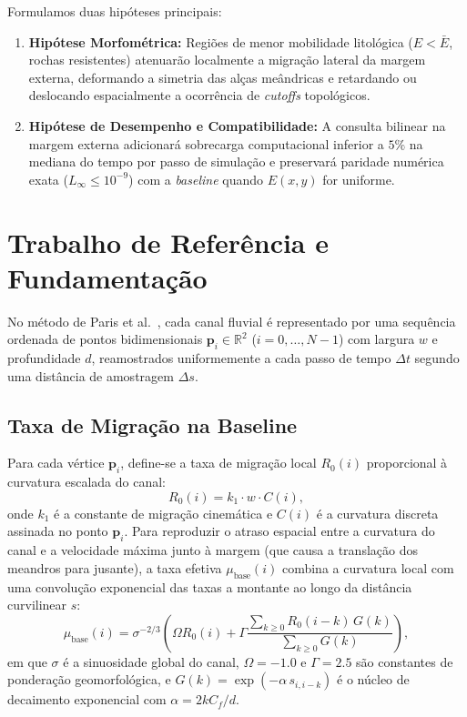 \documentclass[10pt,twocolumn,a4paper]{article}
\begin{document}
Formulamos duas hipóteses principais:
\begin{enumerate}
    \item \textbf{Hipótese Morfométrica:} Regiões de menor mobilidade litológica ($E < \bar{E}$, rochas resistentes) atenuarão localmente a migração lateral da margem externa, deformando a simetria das alças meândricas e retardando ou deslocando espacialmente a ocorrência de \textit{cutoffs} topológicos.
    \item \textbf{Hipótese de Desempenho e Compatibilidade:} A consulta bilinear na margem externa adicionará sobrecarga computacional inferior a $5\%$ na mediana do tempo por passo de simulação e preservará paridade numérica exata ($L_\infty \le 10^{-9}$) com a \textit{baseline} quando $E(x,y)$ for uniforme.
\end{enumerate}

\section{Trabalho de Referência e Fundamentação}
\label{sec:fundamentacao}

No método de Paris et al.~\cite{paris2023meandering}, cada canal fluvial é representado por uma sequência ordenada de pontos bidimensionais $\mathbf{p}_i \in \mathbb{R}^2$ ($i = 0, \dots, N-1$) com largura $w$ e profundidade $d$, reamostrados uniformemente a cada passo de tempo $\Delta t$ segundo uma distância de amostragem $\Delta s$.

\subsection{Taxa de Migração na Baseline}
Para cada vértice $\mathbf{p}_i$, define-se a taxa de migração local $R_0(i)$ proporcional à curvatura escalada do canal:
\begin{equation}
    R_0(i) = k_1 \cdot w \cdot C(i),
    \label{eq:local_migration}
\end{equation}
onde $k_1$ é a constante de migração cinemática e $C(i)$ é a curvatura discreta assinada no ponto $\mathbf{p}_i$. Para reproduzir o atraso espacial entre a curvatura do canal e a velocidade máxima junto à margem (que causa a translação dos meandros para jusante), a taxa efetiva $\mu_{\text{base}}(i)$ combina a curvatura local com uma convolução exponencial das taxas a montante ao longo da distância curvilinear $s$:
\begin{equation}
    \mu_{\text{base}}(i) = \sigma^{-2/3} \left( \Omega R_0(i) + \Gamma \frac{\sum_{k \ge 0} R_0(i-k) \, G(k)}{\sum_{k \ge 0} G(k)} \right),
    \label{eq:total_migration}
\end{equation}
em que $\sigma$ é a sinuosidade global do canal, $\Omega = -1.0$ e $\Gamma = 2.5$ são constantes de ponderação geomorfológica, e $G(k) = \exp(-\alpha \, s_{i, i-k})$ é o núcleo de decaimento exponencial com $\alpha = 2 k C_f / d$.
\end{document}
